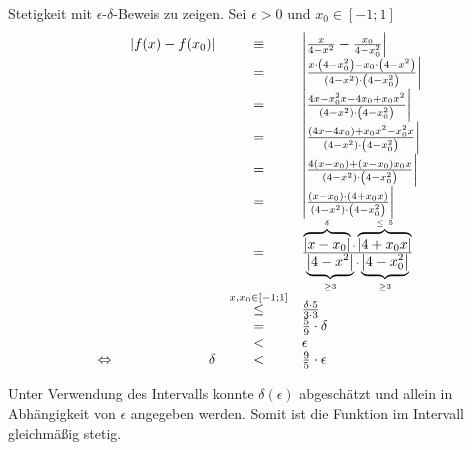 \documentclass[main.tex]{subfiles}
\begin{document}
Stetigkeit mit $\epsilon $-$\delta $-Beweis zu zeigen. Sei $\epsilon >0$ und $x_{0} \in [-1;1]$
\begin{equation*}
	\begin{array}{ c r c l }
		& \ | f( x) -f( x_{0})|  & \equiv  & \left| \frac{x}{4-x^{2}} -\frac{x_{0}}{4-x_{0}^{2}}\right| \\
		&  & = & \left| \frac{x\cdotp \left( 4-x_{0}^{2}\right) -x_{0} \cdotp \left( 4-x^{2}\right)}{\left( 4-x^{2}\right) \cdotp \left( 4-x_{0}^{2}\right)}\right| \\
		&  & = & \left| \frac{4x-x_{0}^{2} x-4x_{0} +x_{0} x^{2}}{\left( 4-x^{2}\right) \cdotp \left( 4-x_{0}^{2}\right)}\right| \\
		&  & = & \left| \frac{( 4x-4x_{0}) +x_{0} x^{2} -x_{0}^{2} x}{\left( 4-x^{2}\right) \cdotp \left( 4-x_{0}^{2}\right)}\right| \\
		&  & = & \left| \frac{4( x-x_{0}) +( x-x_{0}) x_{0} x}{\left( 4-x^{2}\right) \cdotp \left( 4-x_{0}^{2}\right)}\right| \\
		&  & = & \left| \frac{( x-x_{0}) \cdotp ( 4+x_{0} x)}{\left( 4-x^{2}\right) \cdotp \left( 4-x_{0}^{2}\right)}\right| \\
		&  & = & \frac{\overbrace{| x-x_{0}| }^{\delta } \cdotp \overbrace{| 4+x_{0} x| }^{\leq \ 5}}{\underbrace{\left| 4-x^{2}\right| }_{\geq 3} \cdotp \underbrace{\left| 4-x_{0}^{2}\right| }_{\geq 3}}\\
		&  & \overset{x,x_{0} \in [ -1;1]}{\leq } & \frac{\delta \cdotp 5}{3\cdotp 3}\\
		&  & = & \frac{5}{9} \cdotp \delta \\
		&  & <  & \epsilon \\
		\Leftrightarrow  & \delta  & <  & \frac{9}{5} \cdotp \epsilon 
	\end{array}
\end{equation*}

Unter Verwendung des Intervalls konnte $\delta (\epsilon)$ abgeschätzt und allein in Abhängigkeit von $\epsilon $ angegeben werden. Somit ist die Funktion im Intervall gleichmäßig stetig.
\end{document}
